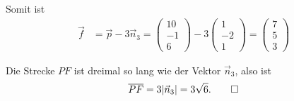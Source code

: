 \begin{loesung}
\begin{teilaufgaben}
Somit ist
\begin{align*}
\vec f
&=
\vec p -3\vec n_3
=
\begin{pmatrix}10\\-1\\6\end{pmatrix}
-3
\begin{pmatrix}1\\-2\\1\end{pmatrix}
=
\begin{pmatrix}7\\5\\3\end{pmatrix}
\end{align*}
\item
Die Strecke $PF$ ist dreimal so lang wie der Vektor $\vec n_3$, also ist
\[
\overline{PF}=3|\vec n_3|=3\sqrt{6}.
\qedhere
\]
\end{teilaufgaben}
\end{loesung}



